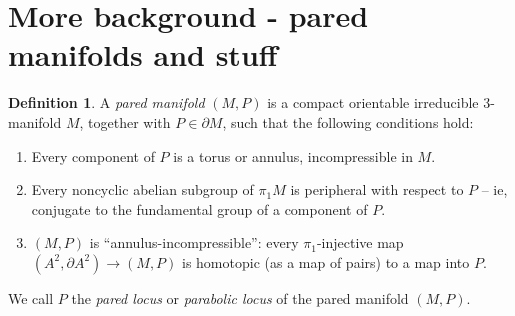 \documentclass[12pt]{amsart}
\theoremstyle{definition}
\newtheorem{Def}[theorem]{Definition}
\def\d{\partial}
\begin{document}
%
%
%
%

\section{More background - pared manifolds and stuff}

%
\begin{Def}

A \emph{pared manifold} $(M,P)$ is a compact orientable irreducible 3-manifold
$M$, together with $P\in\d M$, such that the following conditions hold:

\begin{enumerate}
\item Every component of $P$ is a torus or annulus, incompressible in $M$.
\item Every noncyclic abelian subgroup of $\pi_1M$ is peripheral with respect to
$P$ --
ie, conjugate to the fundamental group of a component of $P$.
\item $(M,P)$ is ``annulus-incompressible'': every $\pi_1$-injective map $(A^2,
\d A^2) \to
(M,P)$ is homotopic (as a map of pairs) to a map into $P$.
\end{enumerate}

We call $P$ the \emph{pared locus} or \emph{parabolic locus} of the pared
manifold $(M,P)$.

\end{Def}
\end{document}
